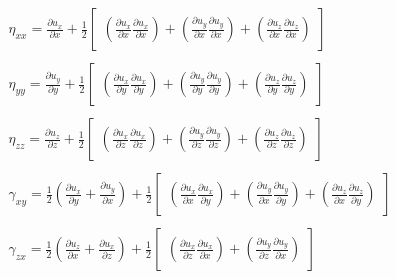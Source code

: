 \begin{equation}
\begin{array}{l}
\eta_{xx} = \frac{\partial{u_{x}}}{\partial{x}} +
\frac{1}{2}
\begin{bmatrix}
{\left(\frac{\partial{u_{x}}}{\partial{x}}\frac{\partial{u_{x}}}{\partial{x}}\right)}
+
{\left(\frac{\partial{u_{y}}}{\partial{x}}\frac{\partial{u_{y}}}{\partial{x}}\right)}
+
{\left(\frac{\partial{u_{z}}}{\partial{x}}\frac{\partial{u_{z}}}{\partial{x}}\right)}
\end{bmatrix} \\ \; \\
\eta_{yy} = \frac{\partial{u_{y}}}{\partial{y}} +
\frac{1}{2}
\begin{bmatrix}
{\left(\frac{\partial{u_{x}}}{\partial{y}}\frac{\partial{u_{x}}}{\partial{y}}\right)}
+
{\left(\frac{\partial{u_{y}}}{\partial{y}}\frac{\partial{u_{y}}}{\partial{y}}\right)}
+
{\left(\frac{\partial{u_{z}}}{\partial{y}}\frac{\partial{u_{z}}}{\partial{y}}\right)}
\end{bmatrix}\\ \;\\
\eta_{zz} = \frac{\partial{u_{z}}}{\partial{z}} +
\frac{1}{2}
\begin{bmatrix}
{\left(\frac{\partial{u_{x}}}{\partial{z}}\frac{\partial{u_{x}}}{\partial{z}}\right)}
+
{\left(\frac{\partial{u_{y}}}{\partial{z}}\frac{\partial{u_{y}}}{\partial{z}}\right)}
+
{\left(\frac{\partial{u_{z}}}{\partial{z}}\frac{\partial{u_{z}}}{\partial{z}}\right)}
\end{bmatrix}\\ \; \\
\gamma_{xy} = \frac{1}{2}{\left(\frac{\partial{u_{x}}}{\partial{y}} + \frac{\partial{u_{y}}}{\partial{x}}\right)}
+
\frac{1}{2}
\begin{bmatrix}
{\left(\frac{\partial{u_{x}}}{\partial{x}}\frac{\partial{u_{x}}}{\partial{y}}\right)}
+
{\left(\frac{\partial{u_{y}}}{\partial{x}}\frac{\partial{u_{y}}}{\partial{y}}\right)}
+
{\left(\frac{\partial{u_{z}}}{\partial{x}}\frac{\partial{u_{z}}}{\partial{y}}\right)}
\end{bmatrix}\\ \; \\
\gamma_{zx} = \frac{1}{2}{\left(\frac{\partial{u_{z}}}{\partial{x}} + \frac{\partial{u_{x}}}{\partial{z}}\right)}
+
\frac{1}{2}
\begin{bmatrix}
{\left(\frac{\partial{u_{x}}}{\partial{z}}\frac{\partial{u_{x}}}{\partial{x}}\right)}
+
{\left(\frac{\partial{u_{y}}}{\partial{z}}\frac{\partial{u_{y}}}{\partial{x}}\right)}

\end{bmatrix}
\end{array}
\end{equation}
